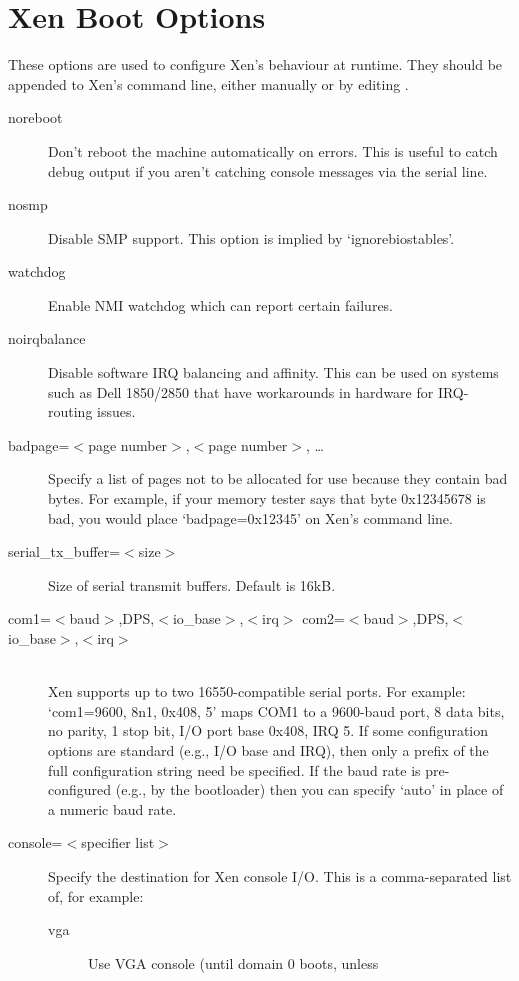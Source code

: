 \documentclass[11pt,twoside,final,openright]{report}
\begin{document}
\section{Xen Boot Options}
\label{s:xboot}

These options are used to configure Xen's behaviour at runtime.  They
should be appended to Xen's command line, either manually or by
editing .

\begin{description}
\item [ noreboot ] Don't reboot the machine automatically on errors.
  This is useful to catch debug output if you aren't catching console
  messages via the serial line.
\item [ nosmp ] Disable SMP support.  This option is implied by
  `ignorebiostables'.
\item [ watchdog ] Enable NMI watchdog which can report certain
  failures.
\item [ noirqbalance ] Disable software IRQ balancing and affinity.
  This can be used on systems such as Dell 1850/2850 that have
  workarounds in hardware for IRQ-routing issues.
\item [ badpage=$<$page number$>$,$<$page number$>$, \ldots ] Specify
  a list of pages not to be allocated for use because they contain bad
  bytes. For example, if your memory tester says that byte 0x12345678
  is bad, you would place `badpage=0x12345' on Xen's command line.
\item [ serial\_tx\_buffer=$<$size$>$ ] Size of serial transmit
  buffers. Default is 16kB.
\item [ com1=$<$baud$>$,DPS,$<$io\_base$>$,$<$irq$>$
  com2=$<$baud$>$,DPS,$<$io\_base$>$,$<$irq$>$ ] \mbox{}\\
  Xen supports up to two 16550-compatible serial ports.  For example:
  `com1=9600, 8n1, 0x408, 5' maps COM1 to a 9600-baud port, 8 data
  bits, no parity, 1 stop bit, I/O port base 0x408, IRQ 5.  If some
  configuration options are standard (e.g., I/O base and IRQ), then
  only a prefix of the full configuration string need be specified. If
  the baud rate is pre-configured (e.g., by the bootloader) then you
  can specify `auto' in place of a numeric baud rate.
\item [ console=$<$specifier list$>$ ] Specify the destination for Xen
  console I/O.  This is a comma-separated list of, for example:
  \begin{description}
  \item[ vga ] Use VGA console (until domain 0 boots, unless {\bf
}
\end{description}
\end{description}
\end{document}
